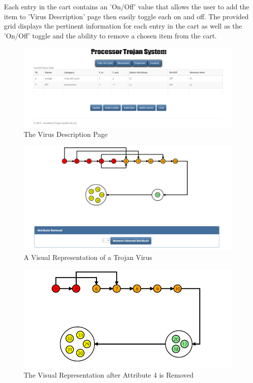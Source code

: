 Each entry in the cart contains an 'On/Off' value that allows the user to add the item to 'Virus Description' page then easily toggle each on and off. The provided grid displays the pertinent information for each entry in the cart as well as the 'On/Off' toggle and the ability to remove a chosen item from the cart.\newline
\begin{figure}[h]
	\centering
	\includegraphics[width=1.1\linewidth]{figures/VirusDescription}
	\caption[The Virus Description Page]{The Virus Description Page}
	\label{fig:VirusDescription}
\end{figure}
\begin{figure}
	\centering
	\includegraphics[width=1\linewidth]{figures/visualization}
	\caption[A Visual Representation of a Trojan Virus]{A Visual Representation of a Trojan Virus}
	\label{fig:visualize2Screen}
\end{figure}
\begin{figure}
	\centering
	\includegraphics[width=0.9\linewidth]{figures/visualizationRemoved}
	\caption[The Visual Representation after Attribute 4 is Removed]{The Visual Representation after Attribute 4 is Removed}
	\label{fig:visualizationRemoved}
\end{figure}


